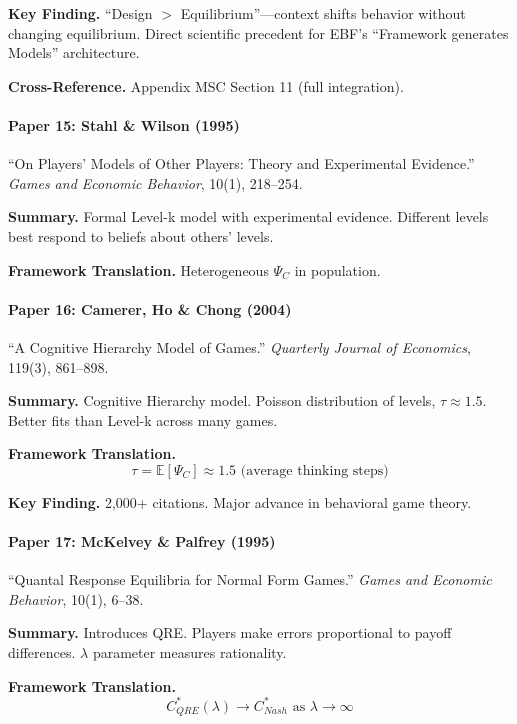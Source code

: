 \textbf{Key Finding.}
``Design $>$ Equilibrium''---context shifts behavior without changing equilibrium.
Direct scientific precedent for EBF's ``Framework generates Models'' architecture.

\textbf{Cross-Reference.} Appendix MSC Section 11 (full integration).

\paragraph{Paper 15: Stahl \& Wilson (1995)}

``On Players' Models of Other Players: Theory and Experimental Evidence.''
\textit{Games and Economic Behavior}, 10(1), 218--254.

\textbf{Summary.}
Formal Level-k model with experimental evidence. Different levels best 
respond to beliefs about others' levels.

\textbf{Framework Translation.}
Heterogeneous $\Psi_C$ in population.

\paragraph{Paper 16: Camerer, Ho \& Chong (2004)}

``A Cognitive Hierarchy Model of Games.''
\textit{Quarterly Journal of Economics}, 119(3), 861--898.

\textbf{Summary.}
Cognitive Hierarchy model. Poisson distribution of levels, $\tau \approx 1.5$.
Better fits than Level-k across many games.

\textbf{Framework Translation.}
\begin{equation}
\tau = \mathbb{E}[\Psi_C] \approx 1.5 \text{ (average thinking steps)}
\end{equation}

\textbf{Key Finding.}
2,000+ citations. Major advance in behavioral game theory.

\paragraph{Paper 17: McKelvey \& Palfrey (1995)}

``Quantal Response Equilibria for Normal Form Games.''
\textit{Games and Economic Behavior}, 10(1), 6--38.

\textbf{Summary.}
Introduces QRE. Players make errors proportional to payoff differences.
$\lambda$ parameter measures rationality.

\textbf{Framework Translation.}
\begin{equation}
C^*_{QRE}(\lambda) \to C^*_{Nash} \text{ as } \lambda \to \infty
\end{equation}

